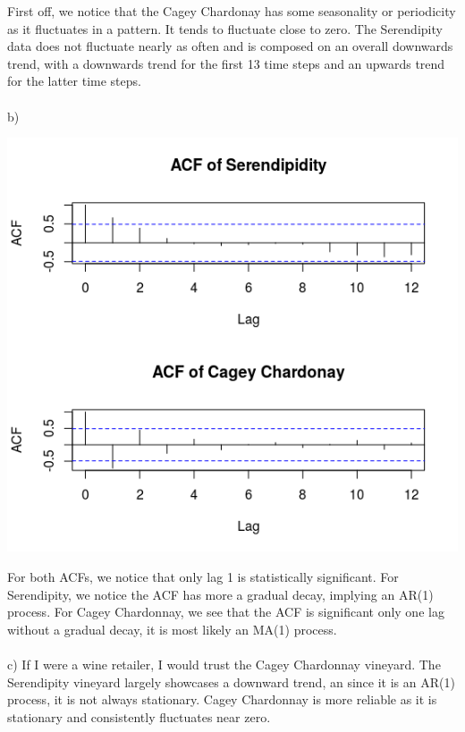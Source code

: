 \documentclass[11pt]{article}
\begin{document}
First off, we notice that the Cagey Chardonay has some seasonality or periodicity as it fluctuates in a pattern. It tends to fluctuate close to zero. The Serendipity data does not fluctuate nearly as often and is composed on an overall downwards trend, with a downwards trend for the first 13 time steps and an upwards trend for the latter time steps.  
\\\\
b)
\begin{center}
	\includegraphics[scale=1]{plt5b}
\end{center}

For both ACFs, we notice that only lag 1 is statistically significant. For Serendipity, we notice the ACF has more a gradual decay, implying an AR(1) process. For Cagey Chardonnay, we see that the ACF is significant only one lag without a gradual decay, it is most likely an MA(1) process.
\\\\
c) If I were a wine retailer, I would trust the Cagey Chardonnay vineyard. The Serendipity vineyard largely showcases a downward trend, an since it is an AR(1) process, it is not always stationary. Cagey Chardonnay is more reliable as it is stationary and consistently fluctuates near zero.
\end{document}
